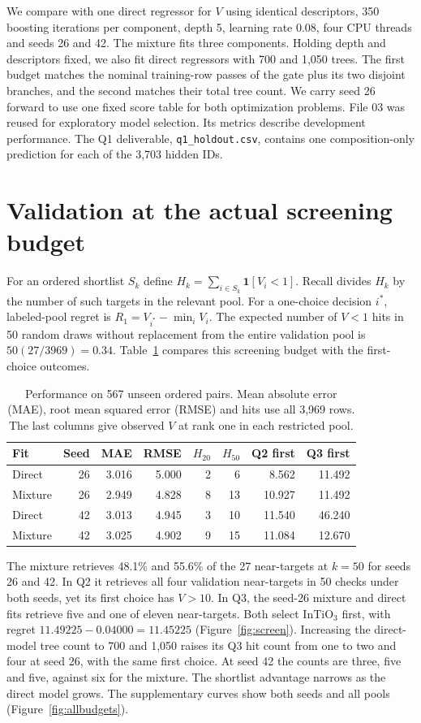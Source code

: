 We compare with one direct regressor for $V$ using identical descriptors, 350 boosting iterations per component, depth 5, learning rate 0.08, four CPU threads and seeds 26 and 42. The mixture fits three components. Holding depth and descriptors fixed, we also fit direct regressors with 700 and 1,050 trees. The first budget matches the nominal training-row passes of the gate plus its two disjoint branches, and the second matches their total tree count. We carry seed 26 forward to use one fixed score table for both optimization problems. File 03 was reused for exploratory model selection. Its metrics describe development performance. The Q1 deliverable, \texttt{q1\_holdout.csv}, contains one composition-only prediction for each of the 3,703 hidden IDs.


\section{Validation at the actual screening budget}
For an ordered shortlist $S_k$ define $H_k=\sum_{i\in S_k}\mathbf1[V_i<1]$. Recall divides $H_k$ by the number of such targets in the relevant pool. For a one-choice decision $i^*$, labeled-pool regret is $R_1=V_{i^*}-\min_i V_i$. The expected number of $V<1$ hits in 50 random draws without replacement from the entire validation pool is $50(27/3969)=0.34$. Table~\ref{tab:val} compares this screening budget with the first-choice outcomes.

\begin{table}[htbp]
\caption{Performance on 567 unseen ordered pairs. Mean absolute error (MAE), root mean squared error (RMSE) and hits use all 3,969 rows. The last columns give observed $V$ at rank one in each restricted pool.}\label{tab:val}
\centering\small\begin{tabular}{lrrrrrrr}
\toprule Fit & Seed & MAE & RMSE & $H_{20}$ & $H_{50}$ & Q2 first & Q3 first\\\midrule
Direct &26&3.016&5.000&2&6&8.562&11.492\\
Mixture &26&2.949&4.828&8&13&10.927&11.492\\
Direct &42&3.013&4.945&3&10&11.540&46.240\\
Mixture &42&3.025&4.902&9&15&11.084&12.670\\\bottomrule
\end{tabular}
\end{table}

The mixture retrieves 48.1\% and 55.6\% of the 27 near-targets at $k=50$ for seeds 26 and 42. In Q2 it retrieves all four validation near-targets in 50 checks under both seeds, yet its first choice has $V>10$. In Q3, the seed-26 mixture and direct fits retrieve five and one of eleven near-targets. Both select $\mathrm{InTiO_3}$ first, with regret $11.49225-0.04000=11.45225$ (Figure~\ref{fig:screen}). Increasing the direct-model tree count to 700 and 1,050 raises its Q3 hit count from one to two and four at seed 26, with the same first choice. At seed 42 the counts are three, five and five, against six for the mixture. The shortlist advantage narrows as the direct model grows. The supplementary curves show both seeds and all pools (Figure~\ref{fig:allbudgets}).

